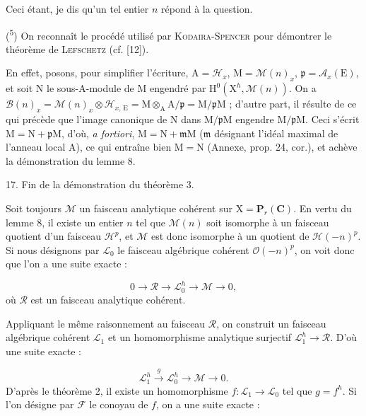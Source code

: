 Ceci étant, je dis qu'un tel entier $n$ répond à la question.

(\textsuperscript{5}) On reconnaît le procédé utilisé par \textsc{Kodaira-Spencer} pour démontrer le théorème de \textsc{Lefschetz} (cf. [12]).



En effet, posons, pour simplifier l'écriture, $\mathrm{A} = \mathcal{H}_x$, $\mathrm{M} = \mathcal{M}(n)_x$, $\mathfrak{p} = \mathcal{A}_x(\mathrm{E})$, et soit $\mathrm{N}$ le sous-$\mathrm{A}$-module de $\mathrm{M}$ engendré par $\mathrm{H}^0(\mathrm{X}^h, \mathcal{M}(n))$. On a $\mathcal{B}(n)_x = \mathcal{M}(n)_x \otimes \mathcal{H}_{x,\,\mathrm{E}} = \mathrm{M} \otimes_{\mathrm{A}} \mathrm{A}/\mathfrak{p} = \mathrm{M}/\mathfrak{p}\mathrm{M}$ ; d'autre part, il résulte de ce qui précède que l'image canonique de $\mathrm{N}$ dans $\mathrm{M}/\mathfrak{p}\mathrm{M}$ engendre $\mathrm{M}/\mathfrak{p}\mathrm{M}$. Ceci s'écrit $\mathrm{M} = \mathrm{N} + \mathfrak{p}\mathrm{M}$, d'où, \textit{a fortiori}, $\mathrm{M} = \mathrm{N} + \mathfrak{m}\mathrm{M}$ ($\mathfrak{m}$ désignant l'idéal maximal de l'anneau local $\mathrm{A}$), ce qui entraîne bien $\mathrm{M} = \mathrm{N}$ (Annexe, prop. 24, cor.), et achève la démonstration du lemme 8.


17. Fin de la démonstration du théorème 3.

Soit toujours $\mathcal{M}$ un faisceau analytique cohérent sur $\mathrm{X} = \mathbf{P}_r(\mathbf{C})$. En vertu du lemme 8, il existe un entier $n$ tel que $\mathcal{M}(n)$ soit isomorphe à un faisceau quotient d'un faisceau $\mathcal{H}^p$, et $\mathcal{M}$ est donc isomorphe à un quotient de $\mathcal{H}(-n)^p$. Si nous désignons par $\mathcal{L}_0$ le faisceau algébrique cohérent $\mathcal{O}(-n)^p$, on voit donc que l'on a une suite exacte :

\begin{equation*}
0 \to \mathcal{R} \to \mathcal{L}_0^h \to \mathcal{M} \to 0,
\end{equation*}
où $\mathcal{R}$ est un faisceau analytique cohérent.

Appliquant le même raisonnement au faisceau $\mathcal{R}$, on construit un faisceau algébrique cohérent $\mathcal{L}_1$ et un homomorphisme analytique surjectif $\mathcal{L}_1^h \to \mathcal{R}$. D'où une suite exacte :

\begin{equation*}
\mathcal{L}_1^h \xrightarrow{\ g\ } \mathcal{L}_0^h \to \mathcal{M} \to 0.
\end{equation*}
D'après le théorème 2, il existe un homomorphisme $f : \mathcal{L}_1 \to \mathcal{L}_0$ tel que $g = f^h$. Si l'on désigne par $\mathcal{F}$ le conoyau de $f$, on a une suite exacte :

